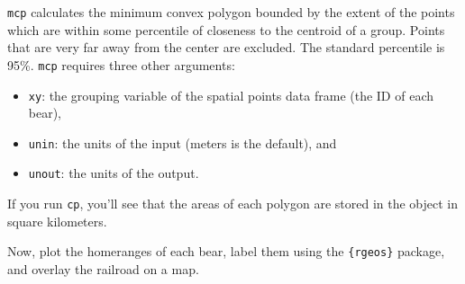 \documentclass[]{book}
\newenvironment{Shaded}{\begin{snugshade}}{\end{snugshade}}
\newcommand{\CommentTok}[1]{\textcolor[rgb]{0.56,0.35,0.01}{\textit{#1}}}
\newcommand{\DataTypeTok}[1]{\textcolor[rgb]{0.13,0.29,0.53}{#1}}
\newcommand{\DecValTok}[1]{\textcolor[rgb]{0.00,0.00,0.81}{#1}}
\newcommand{\FloatTok}[1]{\textcolor[rgb]{0.00,0.00,0.81}{#1}}
\newcommand{\KeywordTok}[1]{\textcolor[rgb]{0.13,0.29,0.53}{\textbf{#1}}}
\newcommand{\NormalTok}[1]{#1}
\newcommand{\OperatorTok}[1]{\textcolor[rgb]{0.81,0.36,0.00}{\textbf{#1}}}
\newcommand{\StringTok}[1]{\textcolor[rgb]{0.31,0.60,0.02}{#1}}
\providecommand{\tightlist}{%
  \setlength{\itemsep}{0pt}\setlength{\parskip}{0pt}}
\begin{document}
\texttt{mcp} calculates the minimum convex polygon bounded by the extent of the points which are within some percentile of closeness to the centroid of a group. Points that are very far away from the center are excluded. The standard percentile is 95\%. \texttt{mcp} requires three other arguments:

\begin{itemize}
\tightlist
\item
  \texttt{xy}: the grouping variable of the spatial points data frame (the ID of each bear),
\item
  \texttt{unin}: the units of the input (meters is the default), and
\item
  \texttt{unout}: the units of the output.
\end{itemize}

If you run \texttt{cp}, you'll see that the areas of each polygon are stored in the object in square kilometers.

Now, plot the homeranges of each bear, label them using the \texttt{\{rgeos\}} package, and overlay the railroad on a map.

\begin{Shaded}
\end{Shaded}
\end{document}
